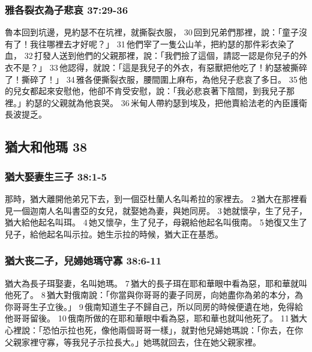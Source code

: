 \subsubsection{雅各裂衣為子悲哀 37:29-36} 
魯本回到坑邊，見約瑟不在坑裡，就撕裂衣服， 30 回到兄弟們那裡，說：「童子沒有了！我往哪裡去才好呢？」 31 他們宰了一隻公山羊，把約瑟的那件彩衣染了血， 32 打發人送到他們的父親那裡，說：「我們撿了這個，請認一認是你兒子的外衣不是？」 33 他認得，就說：「這是我兒子的外衣，有惡獸把他吃了！約瑟被撕碎了！撕碎了！」 34 雅各便撕裂衣服，腰間圍上麻布，為他兒子悲哀了多日。 35 他的兒女都起來安慰他，他卻不肯受安慰，說：「我必悲哀著下陰間，到我兒子那裡。」約瑟的父親就為他哀哭。 36 米甸人帶約瑟到埃及，把他賣給法老的內臣護衛長波提乏。



\subsection{猶大和他瑪 38}
\label{sec:YouDaHeTaMa}
\subsubsection{猶大娶妻生三子 38:1-5} 
那時，猶大離開他弟兄下去，到一個亞杜蘭人名叫希拉的家裡去。 2 猶大在那裡看見一個迦南人名叫書亞的女兒，就娶她為妻，與她同房。 3 她就懷孕，生了兒子，猶大給他起名叫珥。 4 她又懷孕，生了兒子，母親給他起名叫俄南。 5 她復又生了兒子，給他起名叫示拉。她生示拉的時候，猶大正在基悉。

\subsubsection{猶大丧二子，兒婦她瑪守寡 38:6-11} 
猶大為長子珥娶妻，名叫她瑪。 7 猶大的長子珥在耶和華眼中看為惡，耶和華就叫他死了。 8 猶大對俄南說：「你當與你哥哥的妻子同房，向她盡你為弟的本分，為你哥哥生子立後。」 9 俄南知道生子不歸自己，所以同房的時候便遺在地，免得給他哥哥留後。 10 俄南所做的在耶和華眼中看為惡，耶和華也就叫他死了。 11 猶大心裡說：「恐怕示拉也死，像他兩個哥哥一樣」，就對他兒婦她瑪說：「你去，在你父親家裡守寡，等我兒子示拉長大。」她瑪就回去，住在她父親家裡。

